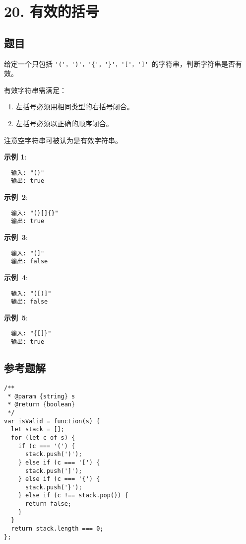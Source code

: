 \newpage
\section{20. 有效的括号}
\label{leetcode:20}

\subsection{题目}

给定一个只包括 \verb|'('，')'，'{'，'}'，'['，']'| 的字符串，判断字符串是否有效。

有效字符串需满足：

\begin{enumerate}
  \item 左括号必须用相同类型的右括号闭合。
  \item 左括号必须以正确的顺序闭合。
\end{enumerate}

注意空字符串可被认为是有效字符串。

\textbf{示例 1}:

\begin{verbatim}
  输入: "()"
  输出: true
\end{verbatim}

\textbf{示例 2}:

\begin{verbatim}
  输入: "()[]{}"
  输出: true
\end{verbatim}

\textbf{示例 3}:

\begin{verbatim}
  输入: "(]"
  输出: false
\end{verbatim}

\textbf{示例 4}:

\begin{verbatim}
  输入: "([)]"
  输出: false
\end{verbatim}

\textbf{示例 5}:

\begin{verbatim}
  输入: "{[]}"
  输出: true
\end{verbatim}

\subsection{参考题解}

\begin{verbatim}
/**
 * @param {string} s
 * @return {boolean}
 */
var isValid = function(s) {
  let stack = [];
  for (let c of s) {
    if (c === '(') {
      stack.push(')');
    } else if (c === '[') {
      stack.push(']');
    } else if (c === '{') {
      stack.push('}');
    } else if (c !== stack.pop()) {
      return false;
    }
  }
  return stack.length === 0;
};
\end{verbatim}
